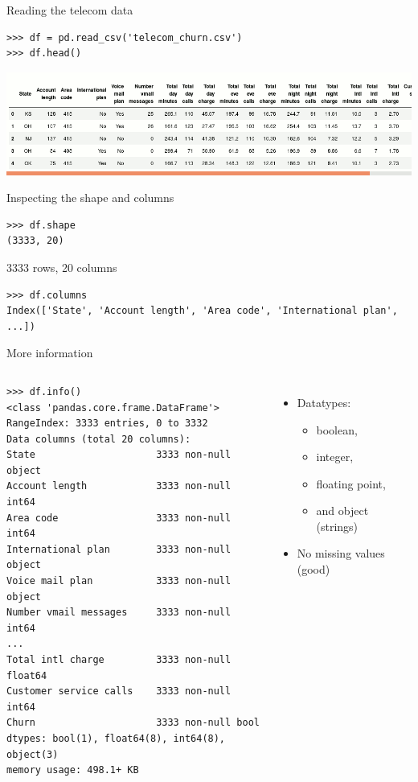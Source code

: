 \documentclass[aspectratio=169,usenames,dvipsnames]{beamer}
\begin{document}
\begin{frame}[fragile]{Reading the telecom data}
\begin{lstlisting}
>>> df = pd.read_csv('telecom_churn.csv')
>>> df.head()
\end{lstlisting}

\includegraphics[width=\linewidth]{fig/telecom}

\end{frame}

\begin{frame}[fragile]{Inspecting the shape and columns}
\begin{lstlisting}
>>> df.shape
(3333, 20)
\end{lstlisting}

3333 rows, 20 columns

\begin{lstlisting}
>>> df.columns
Index(['State', 'Account length', 'Area code', 'International plan', ...])
\end{lstlisting}
\end{frame}

\begin{frame}[fragile]{More information}
\begin{columns}
\begin{lstlisting}
>>> df.info()
<class 'pandas.core.frame.DataFrame'>
RangeIndex: 3333 entries, 0 to 3332
Data columns (total 20 columns):
State                     3333 non-null object
Account length            3333 non-null int64
Area code                 3333 non-null int64
International plan        3333 non-null object
Voice mail plan           3333 non-null object
Number vmail messages     3333 non-null int64
...
Total intl charge         3333 non-null float64
Customer service calls    3333 non-null int64
Churn                     3333 non-null bool
dtypes: bool(1), float64(8), int64(8), object(3)
memory usage: 498.1+ KB
\end{lstlisting}
    \begin{itemize}
        \item Datatypes:
        \begin{itemize}\item boolean, \item integer, \item floating point, \item and object (strings)\end{itemize}
        \item No missing values (good)
    \end{itemize}
\end{columns}
\end{frame}
\end{document}
